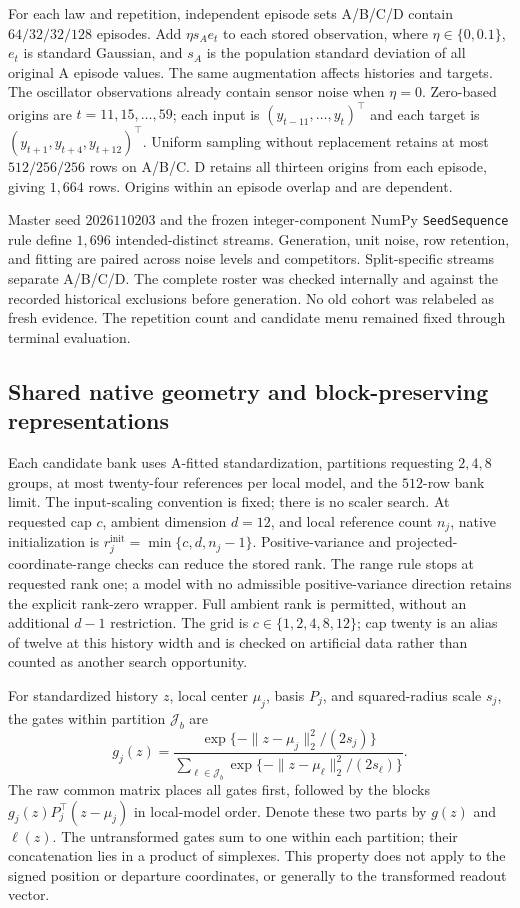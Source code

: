 For each law and repetition, independent episode sets A/B/C/D contain
$64/32/32/128$ episodes. Add $\eta s_A e_t$ to each stored observation,
where $\eta\in\{0,0.1\}$, $e_t$ is standard Gaussian, and $s_A$ is the
population standard deviation of all original A episode values.
The same augmentation affects histories and targets. The oscillator
observations already contain sensor noise when $\eta=0$.
Zero-based origins are $t=11,15,\ldots,59$; each input is
$(y_{t-11},\ldots,y_t)^\top$ and each target is
$(y_{t+1},y_{t+4},y_{t+12})^\top$.
Uniform sampling without replacement retains at most $512/256/256$
rows on A/B/C. D retains all thirteen origins from each episode,
giving $1{,}664$ rows. Origins within an episode overlap and are dependent.

Master seed $2026110203$ and the frozen integer-component NumPy
\texttt{SeedSequence} rule define $1{,}696$ intended-distinct streams.
Generation, unit noise, row retention, and fitting are paired across
noise levels and competitors. Split-specific streams separate A/B/C/D.
The complete roster was checked internally and against the recorded
historical exclusions before generation. No old cohort was relabeled as
fresh evidence. The repetition count and candidate menu remained fixed
through terminal evaluation.

\subsection{Shared native geometry and block-preserving representations}

Each candidate bank uses A-fitted standardization, partitions requesting
$2,4,8$ groups, at most twenty-four references per local model, and the
$512$-row bank limit. The input-scaling convention is fixed; there is no
scaler search. At requested cap $c$, ambient dimension $d=12$, and local
reference count $n_j$, native initialization is
$r_j^{\mathrm{init}}=\min\{c,d,n_j-1\}$.
Positive-variance and projected-coordinate-range checks can reduce the
stored rank. The range rule stops at requested rank one; a model with
no admissible positive-variance direction retains the explicit rank-zero
wrapper. Full ambient rank is permitted, without an additional $d-1$
restriction. The grid is $c\in\{1,2,4,8,12\}$; cap twenty is an alias
of twelve at this history width and is checked on artificial data rather
than counted as another search opportunity.

For standardized history $z$, local center $\mu_j$, basis $P_j$, and
squared-radius scale $s_j$, the gates within partition $\mathcal J_b$ are
\[
 g_j(z)=\frac{\exp\{-\|z-\mu_j\|_2^2/(2s_j)\}}
 {\sum_{\ell\in\mathcal J_b}
       \exp\{-\|z-\mu_\ell\|_2^2/(2s_\ell)\}}.
\]
The raw common matrix places all gates first, followed by the blocks
$g_j(z)P_j^\top(z-\mu_j)$ in local-model order. Denote these two
parts by $g(z)$ and $\ell(z)$. The untransformed gates sum to one
within each partition; their concatenation lies in a product of
simplexes. This property does not apply to the signed position or
departure coordinates, or generally to the transformed readout vector.

